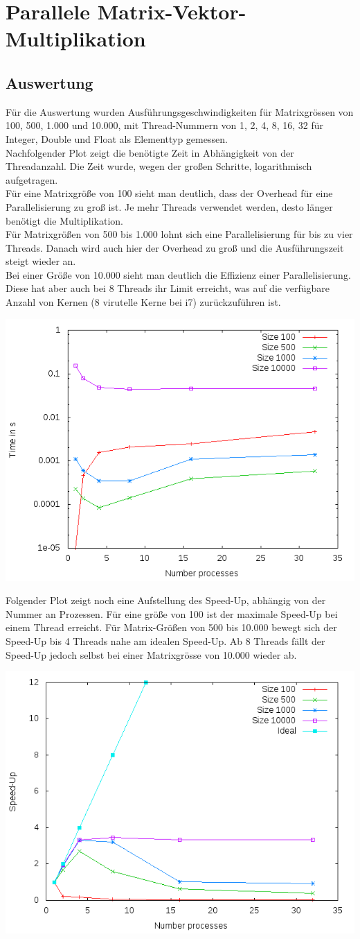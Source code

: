 \documentclass{article}
\newcommand{\enterProblemHeader}[1]{
}
\newcommand{\exitProblemHeader}[1]{
}
\newcounter{homeworkProblemCounter} %
\newcommand{\homeworkProblemName}{}
\newenvironment{homeworkProblem}[1][Problem \arabic{homeworkProblemCounter}]{ %
\stepcounter{homeworkProblemCounter} %
\renewcommand{\homeworkProblemName}{#1} %
\section{\homeworkProblemName} %
}{
}
\begin{document}
\begin{homeworkProblem}[Parallele Matrix-Vektor-Multiplikation]
\subsection{Auswertung}
Für die Auswertung wurden Ausführungsgeschwindigkeiten für Matrixgrössen von 100, 500,
1.000 und 10.000, mit Thread-Nummern von 1, 2, 4, 8, 16, 32 für Integer, Double und 
Float als Elementtyp gemessen. 
\\
Nachfolgender Plot zeigt die benötigte Zeit in Abhängigkeit von der Threadanzahl. Die 
Zeit wurde, wegen der großen Schritte, logarithmisch aufgetragen.
\\
Für eine Matrixgröße von 100 sieht man deutlich, dass der Overhead für eine
Parallelisierung zu groß ist. Je mehr Threads verwendet werden, desto länger benötigt 
die Multiplikation.
\\
Für Matrixgrößen von 500 bis 1.000 lohnt sich eine Parallelisierung für bis zu vier 
Threads. Danach wird auch hier der Overhead zu groß und die Ausführungszeit steigt
wieder an.
\\
Bei einer Größe von 10.000 sieht man deutlich die Effizienz einer Parallelisierung. 
Diese hat aber auch bei 8 Threads ihr Limit erreicht, was auf die verfügbare Anzahl
von Kernen (8 virutelle Kerne bei i7) zurückzuführen ist.
\begin{center}
\includegraphics[width=0.7\columnwidth]{time-to-size}
\end{center}
Folgender Plot zeigt noch eine Aufstellung des Speed-Up, abhängig von der Nummer an
Prozessen. Für eine größe von 100 ist der maximale Speed-Up bei einem Thread erreicht.
Für Matrix-Größen von 500 bis 10.000 bewegt sich der Speed-Up bis 4 Threads nahe am
idealen Speed-Up. Ab 8 Threads fällt der Speed-Up jedoch selbst bei einer Matrixgrösse 
von 10.000 wieder ab.
\begin{center}
\includegraphics[width=0.7\columnwidth]{speed-up}

\end{center}
\end{homeworkProblem}
\end{document}
